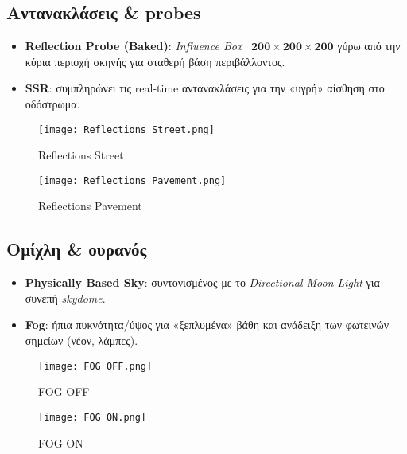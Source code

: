 \subsection*{Αντανακλάσεις \& probes}
\begin{itemize}
  \item \textbf{Reflection Probe (Baked)}: \textit{Influence Box} ~\(\mathbf{200\times200\times200}\) γύρω από την κύρια περιοχή σκηνής για σταθερή βάση περιβάλλοντος.
  \item \textbf{SSR}: συμπληρώνει τις real-time αντανακλάσεις για την «υγρή» αίσθηση στο οδόστρωμα.
\end{itemize}
\begin{figure}[H]
    \centering
    \texttt{[image: Reflections Street.png]}
    \caption{Reflections Street}
    \label{fig:placeholder}
\end{figure}
\begin{figure}[H]
    \centering
    \texttt{[image: Reflections Pavement.png]}
    \caption{Reflections Pavement}
    \label{fig:placeholder}
\end{figure}

\subsection*{Ομίχλη \& ουρανός}
\begin{itemize}
  \item \textbf{Physically Based Sky}: συντονισμένος με το \emph{Directional Moon Light} για συνεπή \emph{skydome}.
  \item \textbf{Fog}: ήπια πυκνότητα/ύψος για «ξεπλυμένα» βάθη και ανάδειξη των φωτεινών σημείων (νέον, λάμπες).
\end{itemize}

\begin{figure}[H]
    \centering
    \texttt{[image: FOG OFF.png]}
    \caption{FOG OFF}
    \label{fig:placeholder}
\end{figure}
\begin{figure}[H]
    \centering
    \texttt{[image: FOG ON.png]}
    \caption{FOG ON}
    \label{fig:placeholder}
\end{figure}
